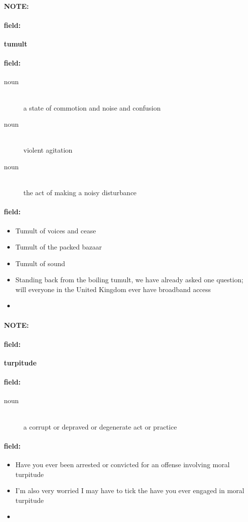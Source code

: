 \documentclass[12pt]{article}
\newenvironment{note}{\paragraph{NOTE:}}{}
\newenvironment{field}{\paragraph{field:}}{}
\begin{document}
\begin{note}
\begin{field}
\textbf{\large tumult}
\end{field}


\begin{field}
\begin{description}
\item[noun] \hfill \\ 
a state of commotion and noise and confusion

\item[noun] \hfill \\ 
violent agitation

\item[noun] \hfill \\ 
the act of making a noisy disturbance

\end{description}
\end{field}

\begin{field}
\begin{itemize}
\item Tumult of voices and cease
\item Tumult of the packed bazaar
\item Tumult of sound
\item Standing back from the boiling tumult, we have already asked one question; will everyone in the United Kingdom ever have broadband access
\item 
\end{itemize}
\end{field}
\end{note}
\begin{note}
\begin{field}
\textbf{\large turpitude}
\end{field}


\begin{field}
\begin{description}
\item[noun] \hfill \\ 
a corrupt or depraved or degenerate act or practice

\end{description}
\end{field}

\begin{field}
\begin{itemize}
\item Have you ever been arrested or convicted for an offense involving moral turpitude
\item I'm also very worried I may have to tick the have you ever engaged in moral turpitude
\item 
\end{itemize}
\end{field}
\end{note}
\end{document}
